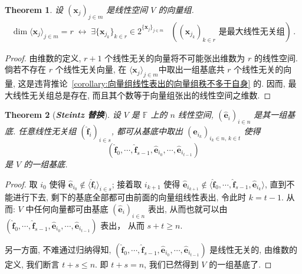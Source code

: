 \documentclass[openany]{ctexbook}
\newcommand*{\indexbf}[1]{\emph{\textbf{#1}}\index{#1}} %
\theoremstyle{plain}
\newtheorem{theorem}{Theorem}[section] %
\theoremstyle{definition}
\newcommand*{\basis}[1]{\hat{\boldsymbol{#1}}} %
\newcommand*{\bv}{\boldsymbol} %
\newcommand*{\IFF}{\;\leftrightarrow\;} %
\begin{document}
\begin{theorem}\label{corollary:秩与维数}
	设 $ (\bv x_j)_{j \in m}$ 是线性空间 $V$ 的向量组.
	\begin{align*}
		\dim \langle \bv x_j\rangle_{j \in m} = r
		\IFF
		\exists \{\bv x_{j_k}\}_{k \in r} \in 2^{\{\bv x_j\}_{j \in m}} 
		&\left( 	
			\text{$(\bv x_{j_k})_{k \in r}$ 是最大线性无关组}
		\right)\,.
	\end{align*}
\end{theorem}
\begin{proof}
	由维数的定义, $r + 1$ 个线性无关的向量将不可能张出维数为 $r$ 的线性空间.
	倘若不存在 $r$ 个线性无关向量, 在 $\langle \bv x_j\rangle_{j \in m} $中取出一组基底共 $r$ 个线性无关的向量, 这是违背推论~\ref{corollary:向量组线性表出的向量组秩不多于自身} 的. 
	因而, 最大线性无关组总是存在, 而且其个数等于向量组张出的线性空间之维数.
\end{proof}

\begin{theorem}[\indexbf{Steintz 替换}]\label{theorem:Steintz}
	设 $V$ 是 $\mathbb F$ 上的 $n$ 线性空间, $(\basis e_i)_{i \in n}$ 是其一组基底.
	任意线性无关组 $(\basis f_i)_{i \in s}$, 都可从基底中取出 $(\basis e_{i_k})_{i_k \in n,\, k \in t}$ 使得
	\begin{equation*}
		(\basis f_0, \cdots, \basis f_{s-1}, \basis e_{i_0}, \cdots, \basis e_{i_{t-1}})
	\end{equation*}
	是 $V$ 的一组基底.
\end{theorem}
\begin{proof}
	取 $i_0$ 使得 $\basis e_{i_0} \notin \langle\basis f_i\rangle_{i \in s}$; 
	接着取 $i_{k+1}$ 使得 $\basis e_{i_{k+1}} \notin \langle \basis f_0, \cdots, \basis f_{s-1}, \basis e_{i_k} \rangle $, 直到不能进行下去, 剩下的基底全部都可由前面的向量组线性表出, 令此时 $k = t - 1$.
	从而: $V$ 中任何向量都可由基底 $(\basis e_i)_{i \in n}$ 表出, 从而也就可以由
	$
		(\basis f_0, \cdots, \basis f_{s-1}, \basis e_{i_0}, \cdots, \basis e_{i_{t-1}})
	$ 表出， 从而 $s + t \geq n$. 

	另一方面, 不难通过归纳得知, 
	$
		(\basis f_0, \cdots, \basis f_{s-1}, \basis e_{i_0}, \cdots, \basis e_{i_{t-1}})
	$ 是线性无关的, 由维数的定义, 我们断言 $t + s \leq n$. 
	即 $t + s = n$, 我们已然得到 $V$ 的一组基底了.
\end{proof}
\end{document}
